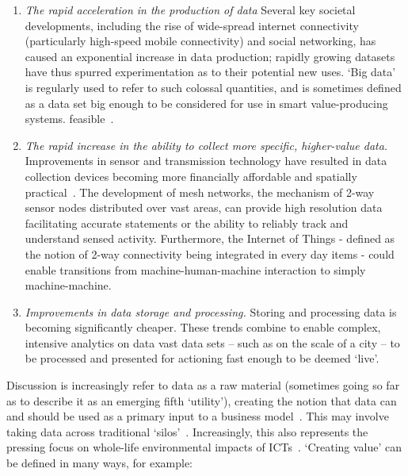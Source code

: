 \documentclass[journal]{IEEEtran}
\begin{document}
\begin{enumerate}
\item {\emph{The rapid acceleration in the production of data}}
Several key societal developments, including the rise of wide-spread
internet connectivity (particularly high-speed mobile connectivity)
and social networking, has caused an exponential increase in data
production; rapidly growing datasets have thus spurred experimentation
as to their potential new uses. `Big data' is regularly used to refer
to such colossal quantities, and is sometimes defined as a data set
big enough to be considered for use in smart value-producing
systems. feasible~\cite{hollands:2008,ibmsmartcities:2009,ciscoconcities:2010}.
\item {\emph{The rapid increase in the ability to collect more
specific, higher-value data.}} Improvements in sensor and transmission
technology have resulted in data collection devices becoming more
financially affordable and spatially
practical~\cite{townsend:2013}. The development of mesh networks, the
mechanism of 2-way sensor nodes distributed over vast areas, can
provide high resolution data facilitating accurate statements or the
ability to reliably track and understand sensed activity. Furthermore,
the Internet of Things - defined as the notion of 2-way connectivity
being integrated in every day items - could enable transitions from
machine-human-machine interaction to simply machine-machine.
\item {\emph{Improvements in data storage and processing.}}  Storing
and processing data is becoming significantly cheaper. These trends
combine to enable complex, intensive analytics on data vast data sets
-- such as on the scale of a city -- to be processed and presented for
actioning fast enough to be deemed `live'.
\end{enumerate}

Discussion is increasingly refer to data as a raw material (sometimes
going so far as to describe it as an emerging fifth `utility'),
creating the notion that data can and should be used as a primary
input to a business model~\cite{arup-et-al:2011}. This may involve
taking data across traditional
`silos'~\cite{shapiro:2006,tsoukalas:2008}. Increasingly, this also
represents the pressing focus on whole-life environmental impacts of
ICTs~\cite{cooper-et-al-gsict:2015}.  `Creating value' can be defined
in many ways, for example:
\end{document}
